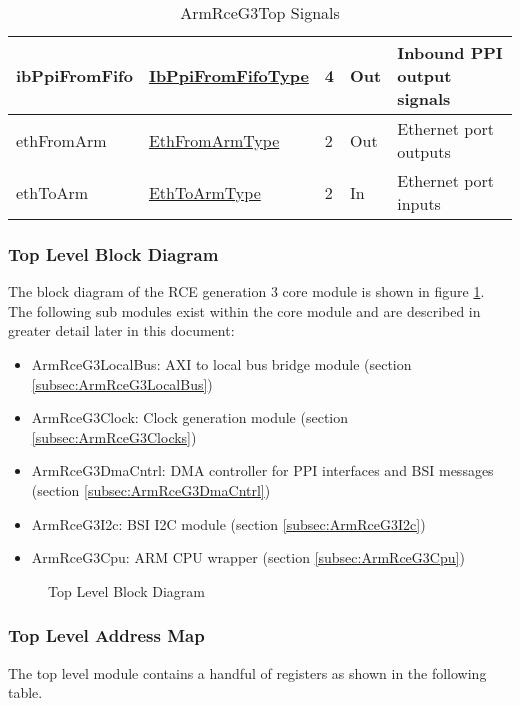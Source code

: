 \documentclass[11pt]{article}
\begin{document}
\begin{table}[H]
\begin{tabular}{| l | l | l | l | l | }
      \hline ibPpiFromFifo     & \hyperref[subsec:IbPpiFromFifoType]{IbPpiFromFifoType} & 4      & Out       & Inbound PPI output signals \\
      \hline ethFromArm        & \hyperref[subsec:EthFromArmType]{EthFromArmType}      & 2      & Out       & Ethernet port outputs \\
      \hline ethToArm          & \hyperref[subsec:EthToArmType]{EthToArmType}             & 2      & In        & Ethernet port inputs  \\
      \hline
   \end{tabular}
   \caption{ArmRceG3Top Signals}
   \label{tab:top_signals}
\end{table}

\subsubsection{Top Level Block Diagram}

The block diagram of the RCE generation 3 core module is shown in figure \ref{fig:top_level_block}. The following sub modules
exist within the core module and are described in greater detail later in this document:

\begin{itemize}
   \item ArmRceG3LocalBus: AXI to local bus bridge module (section \ref{subsec:ArmRceG3LocalBus})
   \item ArmRceG3Clock: Clock generation module (section \ref{subsec:ArmRceG3Clocks})
   \item ArmRceG3DmaCntrl: DMA controller for PPI interfaces and BSI messages (section \ref{subsec:ArmRceG3DmaCntrl})
   \item ArmRceG3I2c: BSI I2C module (section \ref{subsec:ArmRceG3I2c})
   \item ArmRceG3Cpu: ARM CPU wrapper (section \ref{subsec:ArmRceG3Cpu})
\end{itemize}

\begin{figure}[H]
   \centering
   \caption{Top Level Block Diagram}
   \label{fig:top_level_block}
\end{figure}

\subsubsection{Top Level Address Map}

The top level module contains a handful of registers as shown in the following table. 
\end{document}
